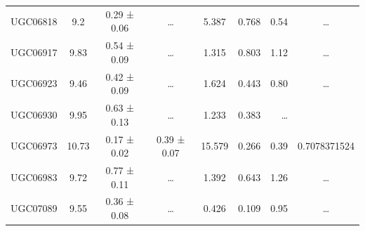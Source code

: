 \documentclass[reprint,%
 amsmath,amssymb,
 aps,
]{revtex4-1}
\begin{document}
\begin{table}[]
\begin{tabular}{cccccrrc}
\rowcolor[HTML]{F3F3F3} 
UGC06818             & 9.2                       & 0.29 ± 0.06           & …                      & 5.387                                                        & 0.768                                                         & 0.54                                                          & …                                                             \\
\rowcolor[HTML]{F3F3F3} 
UGC06917             & 9.83                      & 0.54 ± 0.09           & …                      & 1.315                                                        & 0.803                                                          & 1.12                                                            & …                                                             \\
\rowcolor[HTML]{F3F3F3} 
UGC06923             & 9.46                      & 0.42 ± 0.09           & …                      & 1.624                                                        & 0.443                                                         & 0.80                                                           & …                                                             \\
\rowcolor[HTML]{F3F3F3} 
UGC06930             & 9.95                      & 0.63 ± 0.13           & …                      & 1.233                                                        & 0.383                                      & …                                                             \\
\rowcolor[HTML]{F3F3F3} 
UGC06973             & 10.73                     & 0.17 ± 0.02           & 0.39 ± 0.07            & 15.579                                                       & 0.266                                                          & 0.39                                                           & \multicolumn{1}{r}{\cellcolor[HTML]{F3F3F3}0.7078371524}      \\
\rowcolor[HTML]{F3F3F3} 
UGC06983             & 9.72                      & 0.77 ± 0.11           & …                      & 1.392                                                        & 0.643                                                          & 1.26                                                           & …                                                             \\
\rowcolor[HTML]{F3F3F3} 
UGC07089             & 9.55                      & 0.36 ± 0.08           & …                      & 0.426                                                        & 0.109                                                          & 0.95                                                          & …                                                             \\

\end{tabular}
\end{table}
\end{document}
